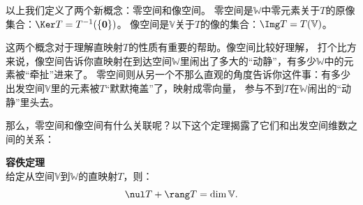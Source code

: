 \documentclass[12pt,UTF8,fontset=none]{ctexbook}
\begin{document}
以上我们定义了两个新概念：零空间和像空间。
零空间是$\mathbb{W}$中零元素关于$T$的原像集合：$\Ker T = T^{-1}(\{\mathbf{0}\})$。
像空间是$\mathbb{V}$关于$T$的像的集合：$\Img T = T(\mathbb{V})$。

这两个概念对于理解直映射$T$的性质有重要的帮助。像空间比较好理解，
打个比方来说，像空间告诉你直映射在到达空间$\mathbb{W}$里闹出了多大的“动静”，有多少$\mathbb{W}$中的元素被“牵扯”进来了。
零空间则从另一个不那么直观的角度告诉你这件事：有多少出发空间$\mathbb{V}$里的元素被$T$“默默掩盖”了，映射成零向量，
参与不到$T$在$\mathbb{W}$闹出的“动静”里头去。

那么，零空间和像空间有什么关联呢？以下这个定理揭露了它们和出发空间维数之间的关系：
\begin{pp}\textbf{容佚定理}\label{pp:3_3_1}\\
    给定从空间$\mathbb{V}$到$\mathbb{W}$的直映射$T$，则：
    $$ \nul T + \rang T = \dim \mathbb{V}. $$
\end{pp}
\end{document}
